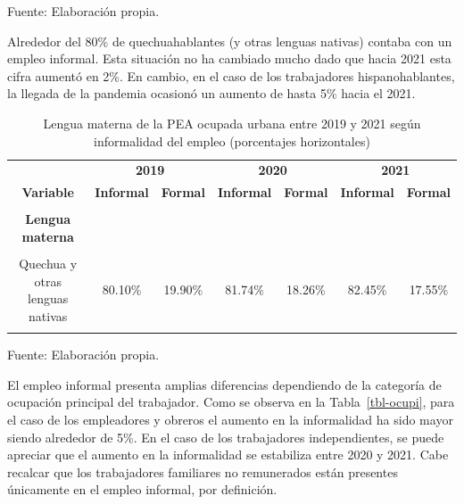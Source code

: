 \documentclass[
  letterpaper,
  12pt,
  oneside,
  spanish,
  doublespacing,
  headsepline,
  parskip]{MastersDoctoralThesis}
\begin{document}
\noindent \small Fuente: Elaboración propia. \normalsize

Alrededor del 80\% de quechuahablantes (y otras lenguas nativas) contaba
con un empleo informal. Esta situación no ha cambiado mucho dado que
hacia 2021 esta cifra aumentó en 2\%. En cambio, en el caso de los
trabajadores hispanohablantes, la llegada de la pandemia ocasionó un
aumento de hasta 5\% hacia el 2021.

\hypertarget{tbl-leng}{}
\begin{table}[H]
\caption{\label{tbl-leng}Lengua materna de la PEA ocupada urbana entre 2019 y 2021 según
informalidad del empleo (porcentajes horizontales) }\tabularnewline

\centering\begingroup\fontsize{10}{12}\selectfont

\begin{tabular}{ccccccc}
\toprule
\multicolumn{1}{c}{ } & \multicolumn{2}{c}{\textbf{2019}} & \multicolumn{2}{c}{\textbf{2020}} & \multicolumn{2}{c}{\textbf{2021}} \\
\cmidrule(l{3pt}r{3pt}){2-3} \cmidrule(l{3pt}r{3pt}){4-5} \cmidrule(l{3pt}r{3pt}){6-7}
\textbf{Variable} & \textbf{Informal} & \textbf{Formal} & \textbf{Informal} & \textbf{Formal} & \textbf{Informal} & \textbf{Formal}\\
\midrule
\cellcolor{gray!6}{\textbf{Nacional}} & \cellcolor{gray!6}{66.40\%} & \cellcolor{gray!6}{33.60\%} & \cellcolor{gray!6}{68.42\%} & \cellcolor{gray!6}{31.58\%} & \cellcolor{gray!6}{71.41\%} & \cellcolor{gray!6}{28.59\%}\\
\textbf{Lengua materna} &  &  &  &  &  & \\
\cellcolor{gray!6}{Castellano} & \cellcolor{gray!6}{64.60\%} & \cellcolor{gray!6}{35.40\%} & \cellcolor{gray!6}{66.01\%} & \cellcolor{gray!6}{33.99\%} & \cellcolor{gray!6}{69.80\%} & \cellcolor{gray!6}{30.20\%}\\
Quechua y otras lenguas nativas & 80.10\% & 19.90\% & 81.74\% & 18.26\% & 82.45\% & 17.55\%\\
\cellcolor{gray!6}{Otros} & \cellcolor{gray!6}{60.12\%} & \cellcolor{gray!6}{39.88\%} & \cellcolor{gray!6}{82.54\%} & \cellcolor{gray!6}{17.46\%} & \cellcolor{gray!6}{70.81\%} & \cellcolor{gray!6}{29.19\%}\\
\bottomrule
\end{tabular}
\endgroup{}
\end{table}

\noindent \small Fuente: Elaboración propia. \normalsize

El empleo informal presenta amplias diferencias dependiendo de la
categoría de ocupación principal del trabajador. Como se observa en la
Tabla~\ref{tbl-ocupi}, para el caso de los empleadores y obreros el
aumento en la informalidad ha sido mayor siendo alrededor de 5\%. En el
caso de los trabajadores independientes, se puede apreciar que el
aumento en la informalidad se estabiliza entre 2020 y 2021. Cabe
recalcar que los trabajadores familiares no remunerados están presentes
únicamente en el empleo informal, por definición.
\end{document}
